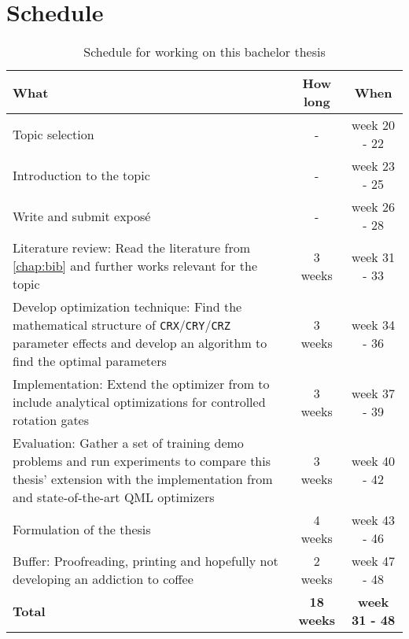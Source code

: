 \chapter{Schedule}
\label{chap:sched}

\begin{table}[h] %
    \centering
    \begin{tabularx}{0.95\textwidth}{X | c | c}
        \textbf{What} & \textbf{How long} & \textbf{When} \\
        \hline
        Topic selection
            & -
            & week 20 - 22 \\
        \rule{0pt}{3ex
        }Introduction to the topic
            & -
            & week 23 - 25 \\
        \rule{0pt}{3ex
        }Write and submit exposé
            & -
            & week 26 - 28 \\
        \hline
        Literature review: Read the literature from \autoref{chap:bib}
            and further works relevant for the topic
            & 3 weeks
            & week 31 - 33 \\
        \rule{0pt}{3ex
        }Develop optimization technique:
            Find the mathematical structure of
            \texttt{CRX}/\texttt{CRY}/\texttt{CRZ} parameter effects and develop
            an algorithm to find the optimal parameters
            & 3 weeks
            & week 34 - 36 \\
        \rule{0pt}{3ex
        }Implementation:
            Extend the optimizer from \cite{wendenius_gradient-free_2023} to
            include analytical optimizations for controlled rotation gates
            & 3 weeks
            & week 37 - 39 \\
        \rule{0pt}{3ex
        }Evaluation:
            Gather a set of training demo problems and run experiments to
            compare this thesis' extension with the implementation from
            \cite{wendenius_gradient-free_2023} and state-of-the-art QML
            optimizers
            & 3 weeks
            & week 40 - 42 \\
        \rule{0pt}{3ex
        }Formulation of the thesis
            & 4 weeks
            & week 43 - 46 \\
        \rule{0pt}{3ex
        }Buffer:
            Proofreading, printing and hopefully not developing an addiction
            to coffee
            & 2 weeks
            & week 47 - 48 \\
        \hline
        \textbf{Total} & \textbf{18 weeks} & \textbf{week 31 - 48}
    \end{tabularx}
    \caption{Schedule for working on this bachelor thesis}
    \label{tab:schedule}
\end{table}